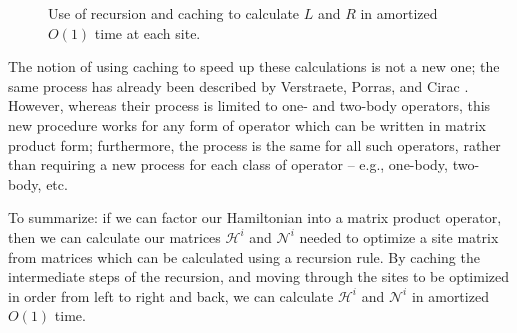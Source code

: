 \documentclass{amsbook}
\theoremstyle{plain}
\theoremstyle{definition}
\theoremstyle{remark}
\begin{document}
\begin{figure}
\caption{Use of recursion and caching to calculate $L$ and $R$ in amortized $O(1)$ time at each site. \label{fig:recursive-LR} }
\end{figure}

The notion of using caching to speed up these calculations is not a new one;  the same process has already been described by Verstraete, Porras, and Cirac \cite{cond-mat/0404706}.  However, whereas their process is limited to one- and two-body operators, this new procedure works for any form of operator which can be written in matrix product form;  furthermore, the process is the same for all such operators, rather than requiring a new process for each class of operator -- e.g., one-body, two-body, etc.

To summarize: if we can factor our Hamiltonian into a matrix product operator, then we can calculate our matrices $\mathscr{H}^i$ and $\mathscr{N}^i$ needed to optimize a site matrix from matrices which can be calculated using a recursion rule.  By caching the intermediate steps of the recursion, and moving through the sites to be optimized in order from left to right and back, we can calculate $\mathscr{H}^i$ and $\mathscr{N}^i$ in amortized $O(1)$ time.
\end{document}
